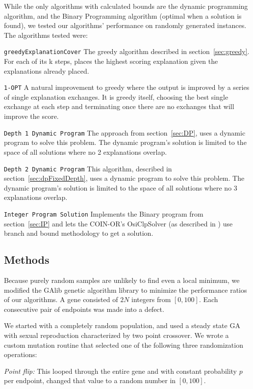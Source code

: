 While the only algorithms with calculated bounds are the dynamic programming algorithm, and the Binary Programming algorithm (optimal when a solution is found), we tested our algorithms' performance on randomly generated instances. The algorithms tested were:

\texttt{greedyExplanationCover} The greedy algorithm described in section~\ref{sec:greedy}.  For each of its k steps, places the highest scoring explanation given the explanations already placed.

\texttt{1-OPT} A natural improvement to greedy where the output is improved by a series of single explanation exchanges.  It is greedy itself, choosing the best single exchange at each step and terminating once there are no exchanges that will improve the score.

\texttt{Depth 1 Dynamic Program} The approach from section~\ref{sec:DP}, uses a dynamic program to solve this problem.  The dynamic program's solution is limited to the space of all solutions where no 2 explanations overlap.

\texttt{Depth 2 Dynamic Program} This algorithm, described in section~\ref{sec:dpFixedDepth}, uses a dynamic program to solve this problem.  The dynamic program's solution is limited to the space of all solutions where no 3 explanations overlap.

\texttt{Integer Program Solution} Implements the Binary program from section~\ref{sec:IP} and lets the COIN-OR's OsiClpSolver (as described in \cite{COIN-OR}) use branch and bound methodology to get a solution.

\subsection{Methods}

Because purely random samples are unlikely to find even a local minimum, we modified the GAlib genetic algorithm library \cite{GAlib} to minimize the performance ratios of our algorithms.  A gene consisted of $2N$ integers from $[0,100]$.  Each consecutive pair of endpoints was made into a defect.  

We started with a completely random population, and used a steady state GA with sexual reproduction characterized by two point crossover.  We wrote a custom mutation routine that selected one of the following three randomization operations:

{\it Point flip:} This looped through the entire gene and with constant probability $p$ per endpoint, changed that value to a random number in $[0,100]$.  

